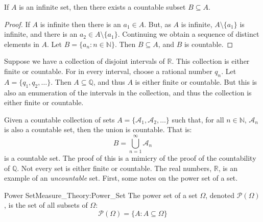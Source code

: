             \begin{theorem}
                If $A$ is an infinite set, then there exists a
                countable subset $B\subseteq{A}$.
            \end{theorem}
            \begin{proof}
                If $A$ is infinite then there is an
                $a_{1}\in{A}$. But, as $A$ is infinite,
                $A\setminus\{a_{1}\}$ is infinite, and there
                is an $a_{2}\in{A}\setminus\{a_{1}\}$. Continuing
                we obtain a sequence of distinct elements in $A$.
                Let $B=\{a_{n}:n\in\mathbb{N}\}$. Then
                $B\subseteq{A}$, and $B$ is countable.
            \end{proof}
            \begin{lexample}
                Suppose we have a collection of disjoint intervals
                of $\mathbb{R}$. This collection is either finite
                or countable. For in every interval, choose a
                rational number $q_{n}$. Let
                $A=\{q_{1},q_{2},\hdots\}$. Then
                $A\subseteq\mathbb{Q}$, and thus $A$ is either
                finite or countable. But this is also an enumeration
                of the intervals in the collection, and thus the
                collection is either finite or countable.
            \end{lexample}
            Given a countable collection of sets
            $A=\{\mathcal{A}_{1},\mathcal{A}_{2},\hdots\}$ such
            that, for all $n\in\mathbb{N}$, $\mathcal{A}_{n}$ is
            also a countable set, then the union is countable. That is:
            \begin{equation}
                B=\bigcup_{n=1}^{\infty}\mathcal{A}_{n}
            \end{equation}
            is a countable set. The proof of this is a mimicry of
            the proof of the countability of $\mathbb{Q}$. Not
            every set is either finite or countable. The real numbers,
            $\mathbb{R}$, is an example of an \textit{uncountable}
            set. First, some notes on the power set of a set.
            \begin{ldefinition}{Power Set}{Measure_Theory:Power_Set}
                The power set of a set $\Omega$, denoted
                $\mathcal{P}(\Omega)$, is the set of all subsets of
                $\Omega$:
                \begin{equation}
                    \mathcal{P}(\Omega)=
                    \{A:A\subseteq\Omega\}
                \end{equation}
            \end{ldefinition}
